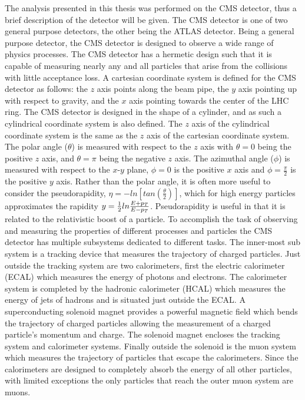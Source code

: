 The analysis presented in this thesis was performed on the CMS detector, thus a brief description of the detector will be given.
The CMS detector is one of two general purpose detectors, the other being the ATLAS detector.
Being a general purpose detector, the CMS detector is designed to observe a wide range of physics processes. 
The CMS detector has a hermetic design such that it is capable of measuring nearly any and all particles that arise from the collisions with little acceptance loss.
A cartesian coordinate system is defined for the CMS detector as follows: the $z$ axis points along the beam pipe, the $y$ axis pointing up with respect to gravity, and the $x$ axis pointing towards the center of the LHC ring.
The CMS detector is designed in the shape of a cylinder, and as such a cylindrical coordinate system is also defined.
The $z$ axis of the cylindrical coordinate system is the same as the $z$ axis of the cartesian coordinate system.
The polar angle ($\theta$) is measured with respect to the $z$ axis with $\theta = 0$ being the positive $z$ axis, and $\theta = \pi$ being the negative $z$ axis.
The azimuthal angle ($\phi$) is measured with respect to the $x$-$y$ plane, $\phi = 0$ is the positive $x$ axis and $\phi = \frac{\pi}{2}$ is the positive $y$ axis.
Rather than the polar angle, it is often more useful to consider the pseudorapidity, $\eta = -ln\left[tan\left(\frac{\theta}{2}\right)\right]$, which for high energy particles approximates the rapidity $y = \frac{1}{2} ln\frac{E+p_{T}}{E-p_{T}}$. 
Pseudorapidity is useful in that it is related to the relativistic boost of a particle.
To accomplish the task of observing and measuring the properties of different processes and particles the CMS detector has multiple subsystems dedicated to different tasks.
The inner-most sub system is a tracking device that measures the trajectory of charged particles.
Just outside the tracking system are two calorimeters, first the electric calorimeter (ECAL) which measures the energy of photons and electrons. 
The calorimeter system is completed by the hadronic calorimeter (HCAL) which measures the energy of jets of hadrons and is situated just outside the ECAL.
A superconducting solenoid magnet provides a powerful magnetic field which bends the trajectory of charged particles allowing the measurement of a charged particle's momentum and charge.
The solenoid magnet encloses the tracking system and calorimeter systems.
Finally outside the solenoid is the muon system which measures the trajectory of particles that escape the calorimeters.
Since the calorimeters are designed to completely absorb the energy of all other particles, with limited exceptions the only particles that reach the outer muon system are muons.
